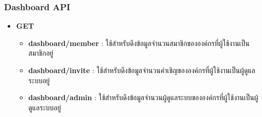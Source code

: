 \subsubsection{Dashboard API}

\ifenglish
\else
\begin{itemize}
    \item \textbf{GET}
    \begin{itemize}
        \item \textbf{dashboard/member} : ใช้สำหรับดึงข้อมูลจำนวนสมาชิกขององค์กรที่ผู้ใช้งานเป็นสมาชิกอยู่
        \item \textbf{dashboard/invite} : ใช้สำหรับดึงข้อมูลจำนวนคำเชิญขององค์กรที่ผู้ใช้งานเป็นผู้ดูแลระบบอยู่
        \item \textbf{dashboard/admin} : ใช้สำหรับดึงข้อมูลจำนวนผู้ดูแลระบบขององค์กรที่ผู้ใช้งานเป็นผู้ดูแลระบบอยู่
    \end{itemize}
\end{itemize}
\fi